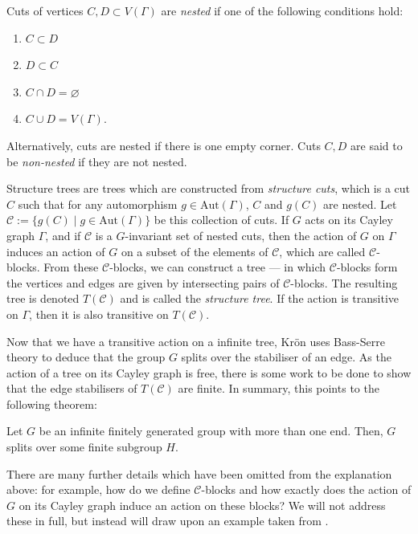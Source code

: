 \begin{definition}[Nested]
    Cuts of vertices \(C, D \subset V(\Gamma)\) are \emph{nested} if one of the following conditions hold:
    \begin{enumerate}
        \item \(C \subset D\)
        \item \(D \subset C\)
        \item \(C \cap D = \varnothing\)
        \item \(C \cup D = V(\Gamma)\).
    \end{enumerate}
    Alternatively, cuts are nested if there is one empty corner. Cuts \(C,D\) are said to be \emph{non-nested} if they are not nested.
\end{definition}

Structure trees are trees which are constructed from \emph{structure cuts}, which is a cut \(C\) such that for any automorphism \(g \in \mathrm{Aut}(\Gamma)\), \(C\) and \(g(C)\) are nested. Let \(\mathcal{C} := \{g(C) \mid g \in \mathrm{Aut}(\Gamma)\}\) be this collection of cuts. If \(G\) acts on its Cayley graph \(\Gamma\), and if \(\mathcal{C}\) is a \(G\)-invariant set of nested cuts, then the action of \(G\) on \(\Gamma\) induces an action of \(G\) on a subset of the elements of \(\mathcal{C}\), which are called \(\mathcal{C}\)-blocks. From these \(\mathcal{C}\)-blocks, we can construct a tree --- in which \(\mathcal{C}\)-blocks form the vertices and edges are given by intersecting pairs of \(\mathcal{C}\)-blocks. The resulting tree is denoted \(T(\mathcal{C})\) and is called the \emph{structure tree}. If the action is transitive on \(\Gamma\), then it is also transitive on \(T(\mathcal{C})\).

Now that we have a transitive action on a infinite tree, Kr\"{o}n uses Bass-Serre theory to deduce that the group \(G\) splits over the stabiliser of an edge. As the action of a tree on its Cayley graph is free, there is some work to be done to show that the edge stabilisers of \(T(\mathcal{C})\) are finite.
In summary, this points to the following theorem:

\begin{theorem}
    Let \(G\) be an infinite finitely generated group with more than one end. Then, \(G\) splits over some finite subgroup \(H\). 
\end{theorem}

\begin{remark}
    There are many further details which have been omitted from the explanation above: for example, how do we define \(\mathcal{C}\)-blocks and how exactly does the action of \(G\) on its Cayley graph induce an action on these blocks? We will not address these in full, but instead will draw upon an example taken from \cite[p.~14]{D13}.
\end{remark}

